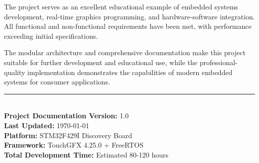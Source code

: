\documentclass[12pt,a4paper]{article}
\begin{document}
The project serves as an excellent educational example of embedded systems development, real-time graphics programming, and hardware-software integration. All functional and non-functional requirements have been met, with performance exceeding initial specifications.

The modular architecture and comprehensive documentation make this project suitable for further development and educational use, while the professional-quality implementation demonstrates the capabilities of modern embedded systems for consumer applications.

\vfill

\begin{center}
\rule{0.8\textwidth}{0.4pt}\\[0.5cm]
\textbf{Project Documentation Version:} 1.0\\
\textbf{Last Updated:} \today\\
\textbf{Platform:} STM32F429I Discovery Board\\
\textbf{Framework:} TouchGFX 4.25.0 + FreeRTOS\\
\textbf{Total Development Time:} Estimated 80-120 hours
\end{center}
\end{document}
